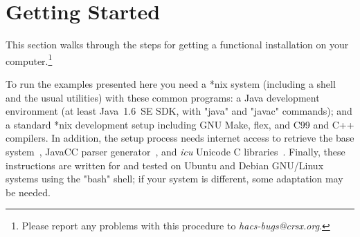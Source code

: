 \documentclass[11pt]{article} %
\begin{document}
\section{Getting Started}
\label{sec:run}

This section walks through the steps for getting a functional \HAX installation on your
computer.\footnote{Please report any problems with this procedure to \emph{hacs-bugs@crsx.org}.}

\begin{requirements}
  To run the \HAX examples presented here you need a *nix system (including a shell and the usual
  utilities) with these common programs: a Java development environment (at least Java~1.6~SE SDK,
  with "java" and "javac" commands); and a standard *nix development setup including GNU Make, flex,
  and C99 and C++ compilers. In addition, the setup process needs internet access to retrieve the
  \CRSX base system~\cite{crsx}, JavaCC parser generator~\cite{JavaCC}, and \emph{icu} Unicode C
  libraries~\cite{ICU}. Finally, these instructions are written for and tested on Ubuntu and Debian
  GNU/Linux systems using the "bash" shell; if your system is different, some adaptation may be
  needed.
\end{requirements}
\end{document}
